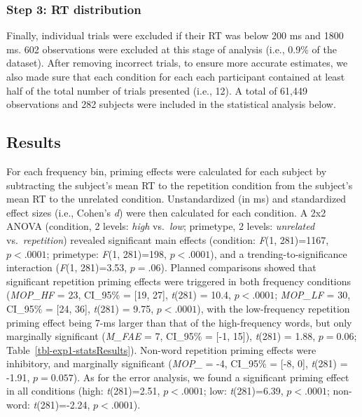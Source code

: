 \documentclass[
]{interact}
\begin{document}
\subsubsection{Step 3: RT distribution}\label{sec-exp1-analysis-RT}

Finally, individual trials were excluded if their RT was below 200 ms
and 1800 ms. 602 observations were excluded at this stage of analysis
(i.e., 0.9\% of the dataset). After removing incorrect trials, to ensure
more accurate estimates, we also made sure that each condition for each
each participant contained at least half of the total number of trials
presented (i.e., 12). A total of 61,449 observations and 282 subjects
were included in the statistical analysis below.

\subsection{Results}\label{sec-exp1-results}

For each frequency bin, priming effects were calculated for each subject
by subtracting the subject's mean RT to the repetition condition from
the subject's mean RT to the unrelated condition. Unstandardized (in ms)
and standardized effect sizes (i.e., Cohen's \emph{d}) were then
calculated for each condition. A 2x2 ANOVA (condition, 2 levels:
\emph{high} vs.~\emph{low}; primetype, 2 levels: \emph{unrelated}
vs.~\emph{repetition}) revealed significant main effects (condition:
\emph{F}(1, 281)=1167, \(p<.0001\); primetype: \emph{F}(1, 281)=198,
\(p<.0001\)), and a trending-to-significance interaction (\emph{F}(1,
281)=3.53, \(p=.06\)). Planned comparisons showed that significant
repetition priming effects were triggered in both frequency conditions
(\emph{MOP\_HF} = 23, CI\_95\% = {[}19, 27{]}, \emph{t}(281) = 10.4,
\(p<.0001\); \emph{MOP\_LF} = 30, CI\_95\% = {[}24, 36{]}, \emph{t}(281)
= 9.75, \(p<.0001\)), with the low-frequency repetition priming effect
being 7-ms larger than that of the high-frequency words, but only
marginally significant (\emph{M\_FAE} = 7, CI\_95\% = {[}-1, 15{]}),
\emph{t}(281) = 1.88, \(p=0.06\); Table~\ref{tbl-exp1-statsResults}).
Non-word repetition priming effects were inhibitory, and marginally
significant (\emph{MOP\_} = -4, CI\_95\% = {[}-8, 0{]}, \emph{t}(281) =
-1.91, \(p=0.057\)). As for the error analysis, we found a significant
priming effect in all conditions (high: \emph{t}(281)=2.51, \(p<.0001\);
low: \emph{t}(281)=6.39, \(p<.0001\); non-word: \emph{t}(281)=-2.24,
\(p<.0001\)).
\end{document}
